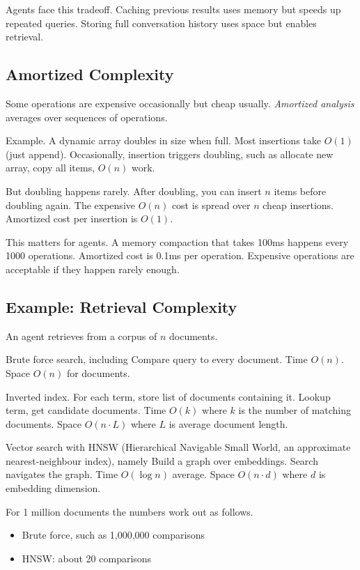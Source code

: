 Agents face this tradeoff. Caching previous results uses memory but speeds up repeated queries. Storing full conversation history uses space but enables retrieval.

\subsection{Amortized Complexity}

Some operations are expensive occasionally but cheap usually. \textit{Amortized analysis} averages over sequences of operations.

Example. A dynamic array doubles in size when full. Most insertions take $O(1)$ (just append). Occasionally, insertion triggers doubling, such as allocate new array, copy all items, $O(n)$ work.

But doubling happens rarely. After doubling, you can insert $n$ items before doubling again. The expensive $O(n)$ cost is spread over $n$ cheap insertions. Amortized cost per insertion is $O(1)$.

This matters for agents. A memory compaction that takes 100ms happens every 1000 operations. Amortized cost is 0.1ms per operation. Expensive operations are acceptable if they happen rarely enough.

\subsection{Example: Retrieval Complexity}

An agent retrieves from a corpus of $n$ documents.

Brute force search, including Compare query to every document. Time $O(n)$. Space $O(n)$ for documents.

Inverted index. For each term, store list of documents containing it. Lookup term, get candidate documents. Time $O(k)$ where $k$ is the number of matching documents. Space $O(n \cdot L)$ where $L$ is average document length.

Vector search with HNSW (Hierarchical Navigable Small World, an approximate nearest-neighbour index), namely Build a graph over embeddings. Search navigates the graph. Time $O(\log n)$ average. Space $O(n \cdot d)$ where $d$ is embedding dimension.

For 1 million documents the numbers work out as follows.
\begin{itemize}
\item Brute force, such as 1,000,000 comparisons
\item HNSW: about 20 comparisons
\end{itemize}

